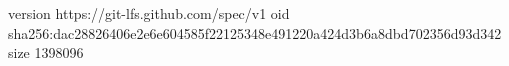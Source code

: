 version https://git-lfs.github.com/spec/v1
oid sha256:dac28826406e2e6e604585f22125348e491220a424d3b6a8dbd702356d93d342
size 1398096
